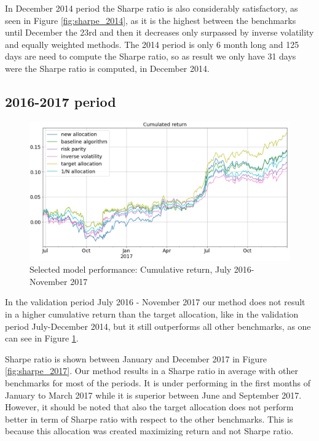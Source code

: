In December 2014 period the Sharpe ratio is also considerably satisfactory, as seen in Figure \ref{fig:sharpe_2014}, as it is the highest between the benchmarks until December the 23rd and then it decreases only surpassed by inverse volatility and equally weighted methods.
The 2014 period is only 6 month long and 125 days are need to compute the Sharpe ratio, so as result we only have 31 days were the Sharpe ratio is computed, in December 2014. 

\newpage

\subsection{2016-2017 period}

\begin{figure}[H]
	\includegraphics[width=\textwidth]{cap5/selected_cum_ret_2017.png}
	\caption{Selected model performance: Cumulative return, July 2016-November 2017 }
	\label{fig:return_2017}
\end{figure}

In the validation period July 2016 - November 2017 our method does not result in a higher cumulative return than the target allocation, like in the validation period July-December 2014, but it still outperforms all other benchmarks, as one can see in Figure \ref{fig:return_2017}.

\hfill \break

Sharpe ratio is shown between January and December 2017 in Figure \ref{fig:sharpe_2017}. Our method results in a Sharpe ratio in average with other benchmarks for most of the periods. It is under performing in the first months of January to March 2017 while it is superior between June and September 2017. However, it should be noted that also the target allocation does not perform better in term of Sharpe ratio with respect to the other benchmarks. This is because this allocation was created maximizing return and not Sharpe ratio.

